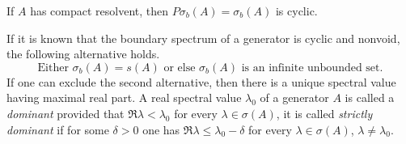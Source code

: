 \begin{corollary}\label{cor:b3-2.10}
If $A$ has compact resolvent, then $P\sigma_{b}(A) = \sigma_{b}(A)$ is cyclic.
\end{corollary}
If it is known that the boundary spectrum of a generator is cyclic and nonvoid, the following alternative holds.
\begin{equation}\label{eq:b3-2.19}
\text{Either $\sigma_{b}(A) = s(A)$ or else  $\sigma_{b}(A)$ is an infinite unbounded set.}
\end{equation}
If one can exclude the second alternative, then there is a unique spectral value having maximal real part.
A real spectral value $\lambda_{0}$ of a generator $A$ is called a \emph{dominant} provided that $\Re\lambda < \lambda_{0}$ for every $\lambda \in \sigma(A)$, it is called \emph{strictly dominant} if for some $\delta > 0$ one has $\Re\lambda \leq \lambda_{0} - \delta$ for every $\lambda \in \sigma(A)$, $\lambda \neq \lambda_{0}$.

